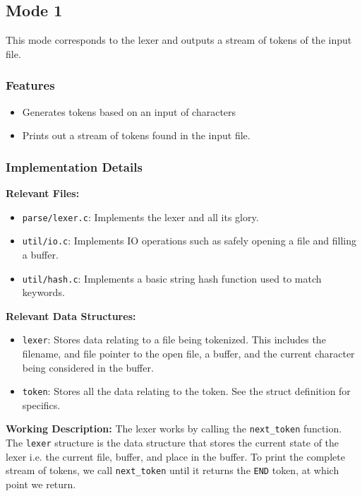 \subsection{Mode 1}
\label{sec:mode-1}

This mode corresponds to the lexer and outputs a stream of tokens of the input file.

\subsubsection{Features}

\begin{itemize}
    \item Generates tokens based on an input of characters
    \item Prints out a stream of tokens found in the input file.
\end{itemize}

\subsubsection{Implementation Details}

\textbf{Relevant Files:}

\begin{itemize}
    \item \verb|parse/lexer.c|: Implements the lexer and all its glory.
    \item \verb|util/io.c|: Implements IO operations such as safely opening a file and filling a buffer.
    \item \verb|util/hash.c|: Implements a basic string hash function used to match keywords.
\end{itemize}

\noindent \textbf{Relevant Data Structures:}

\begin{itemize}
    \item \verb|lexer|: Stores data relating to a file being tokenized. This includes the filename, and file pointer to the open file, a buffer, and the current character being considered in the buffer.
    \item \verb|token|: Stores all the data relating to the token. See the struct definition for specifics.
\end{itemize}

\noindent \textbf{Working Description:} The lexer works by calling the \verb|next_token| function. The \verb|lexer| structure is the data structure that stores the current state of the lexer i.e. the current file, buffer, and place in the buffer. To print the complete stream of tokens, we call \verb|next_token| until it returns the \verb|END| token, at which point we return.

